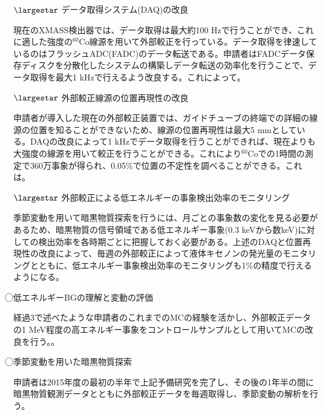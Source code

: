 \documentclass[10pt,a4paper,twoside]{jarticle}
\newcommand{\研究課題名}{XMASS検出器を用いた季節変動による暗黒物質の直接探索}
\newcommand{\研究機関名}{神戸大学}
\newcommand{\申請者氏名}{岡直哉}
\newcommand{\研究代表者氏名}{\申請者氏名}
\newcommand{\研究期間の最終元号年度}{29}	%
\begin{document}
{%
$\largestar$ データ取得システム(DAQ)の改良\par
現在のXMASS検出器では、データ取得は最大約100 Hzで行うことができ、これに適した強度の$^{60}$Co線源を用いて外部較正を行っている。データ取得を律速しているのはフラッシュADC(FADC)のデータ転送である。申請者はFADCデータ保存ディスクを分散化したシステムの構築しデータ転送の効率化を行うことで、データ取得を最大1 kHzで行えるよう改良する。これによって{\bf {}}。\par
$\largestar$ 外部較正線源の位置再現性の改良\par
申請者が導入した現在の外部較正装置では、ガイドチューブの終端での詳細の線源の位置を知ることができないため、線源の位置再現性は最大5 mmとしている。DAQの改良によって1 kHzでデータ取得を行うことができれば、現在よりも大強度の線源を用いて較正を行うことができる。これにより$^{60}$Coでの1時間の測定で360万事象が得られ、0.05\%で位置の不定性を調べることができる。これは{\bf {}}。
\par
$\largestar$ 外部較正による低エネルギーの事象検出効率のモニタリング\par
季節変動を用いて暗黒物質探索を行うには、月ごとの事象数の変化を見る必要があるため、暗黒物質の信号領域である低エネルギー事象(0.3 keVから数keV)に対しての検出効率を各時期ごとに把握しておく必要がある。上述のDAQと位置再現性の改良によって、毎週の外部較正によって液体キセノンの発光量のモニタリングとともに、低エネルギー事象検出効率のモニタリングも1\%の精度で行えるようになる。

\textcircled{}低エネルギーBGの理解と変動の評価\par
経過3で述べたような申請者のこれまでのMCの経験を活かし、外部較正データの1 MeV程度の高エネルギー事象をコントロールサンプルとして用いてMCの改良を行う。{\bf {}}。\par

\textcircled{}季節変動を用いた暗黒物質探索\par
\par
申請者は2015年度の最初の半年で上記予備研究を完了し、その後の1年半の間に暗黒物質観測データとともに外部較正データを毎週取得し、季節変動の解析を行う。




	
	

	
	
	
}
\end{document}
